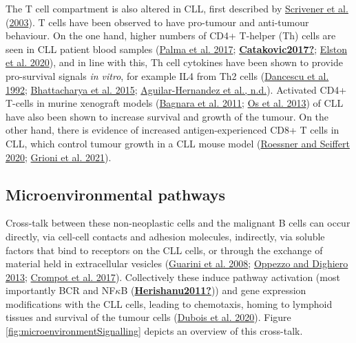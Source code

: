 \documentclass[11pt, a4paper, twosided]{book}
\begin{document}
The T cell compartment is also altered in CLL, first described by \protect\hyperlink{ref-Scrivener2003}{Scrivener et al.} (\protect\hyperlink{ref-Scrivener2003}{2003}). T cells have been observed to have pro-tumour and anti-tumour behaviour. On the one hand, higher numbers of CD4+ T-helper (Th) cells are seen in CLL patient blood samples (\protect\hyperlink{ref-Palma2017}{Palma et al. 2017}; \protect\hyperlink{ref-Catakovic2017}{\textbf{Catakovic2017?}}; \protect\hyperlink{ref-Elston2020}{Elston et al. 2020}), and in line with this, Th cell cytokines have been shown to provide pro-survival signals \emph{in vitro}, for example IL4 from Th2 cells (\protect\hyperlink{ref-Dancescu1992}{Dancescu et al. 1992}; \protect\hyperlink{ref-Bhattacharya2015}{Bhattacharya et al. 2015}; \protect\hyperlink{ref-AguilarHernandez2016}{Aguilar-Hernandez et al., n.d.}). Activated CD4+ T-cells in murine xenograft models (\protect\hyperlink{ref-Bagnara2011}{Bagnara et al. 2011}; \protect\hyperlink{ref-Os2013}{Os et al. 2013}) of CLL have also been shown to increase survival and growth of the tumour. On the other hand, there is evidence of increased antigen-experienced CD8+ T cells in CLL, which control tumour growth in a CLL mouse model (\protect\hyperlink{ref-Roessner2020}{Roessner and Seiffert 2020}; \protect\hyperlink{ref-Grioni2021}{Grioni et al. 2021}).

\hypertarget{intro-microenvironmental-pathways}{%
\subsection{Microenvironmental pathways}\label{intro-microenvironmental-pathways}}

Cross-talk between these non-neoplastic cells and the malignant B cells can occur directly, via cell-cell contacts and adhesion molecules, indirectly, via soluble factors that bind to receptors on the CLL cells, or through the exchange of material held in extracellular vesicles (\protect\hyperlink{ref-Guarini2008}{Guarini et al. 2008}; \protect\hyperlink{ref-Oppezzo2013}{Oppezzo and Dighiero 2013}; \protect\hyperlink{ref-Crompot2017}{Crompot et al. 2017}). Collectively these induce pathway activation (most importantly BCR and NF\(\kappa\)B (\protect\hyperlink{ref-Herishanu2011}{\textbf{Herishanu2011?}})) and gene expression modifications with the CLL cells, leading to chemotaxis, homing to lymphoid tissues and survival of the tumour cells (\protect\hyperlink{ref-Dubois2020}{Dubois et al. 2020}). Figure \ref{fig:microenvironmentSignalling} depicts an overview of this cross-talk.
\end{document}
